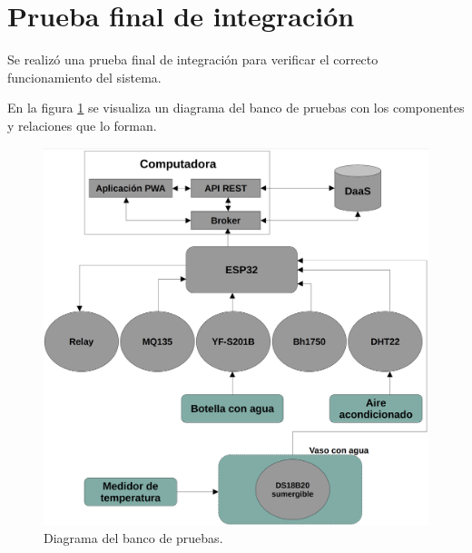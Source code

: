 


\section{Prueba final de integración}

Se realizó una prueba final de integración para verificar el correcto funcionamiento del sistema.

En la figura \ref{fig:diagramaBancoDePruebas} se visualiza un diagrama del banco de pruebas con los componentes y relaciones que lo forman.

\begin{figure}[H]
	\centering
	\includegraphics[width=.9\textwidth]{./Figures/Diagrama del banco de pruebas v2.png}
	\caption{Diagrama del banco de pruebas.}
	\label{fig:diagramaBancoDePruebas}
\end{figure}

